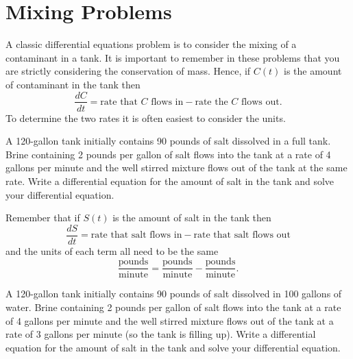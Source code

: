 \newpage\section{Mixing Problems}
A classic differential equations problem is to consider the mixing of a contaminant in a
tank.  It is important to remember in these problems that you are strictly considering the
conservation of mass.  Hence, if $C(t)$ is the amount of contaminant in the tank then
\[ \frac{dC}{dt} = \text{rate that $C$ flows in} - \text{rate the $C$ flows out}. \]
To determine the two rates it is often easiest to consider the units.
\begin{problem}
    A 120-gallon tank initially contains 90 pounds of salt dissolved in a full tank.
    Brine containing 2 pounds per gallon of salt flows into the tank at a rate of 4
    gallons per minute and the well stirred mixture flows out of the tank at the same
    rate.  Write a differential equation for the amount of salt in the tank and solve your
    differential equation.

    Remember that if $S(t)$ is the amount of salt in the tank then
    \[ \frac{dS}{dt} = \text{rate that salt flows in} - \text{rate that salt flows out} \]
    and the units of each term all need to be the same
    \[ \frac{\text{pounds}}{\text{minute}} = \frac{\text{pounds}}{\text{minute}} -
        \frac{\text{pounds}}{\text{minute}}. \]
\end{problem}
\solution{
    \[ \frac{dS}{dt} = 4(2) - \frac{4S}{120} \quad \text{with} \quad S(0) = 90. \]
    \[ \frac{dS}{dt} = -\frac{4}{120} \left( S - 8\left( \frac{120}{4} \right) \right) \]
    \[ S(t) = -150 e^{-4t/120} + 240 \]
}

\begin{problem}
    A 120-gallon tank initially contains 90 pounds of salt dissolved in 100 gallons of
    water.  Brine containing 2 pounds per gallon of salt flows into the tank at a rate of
    4 gallons per minute and the well stirred mixture flows out of the tank at a rate of 3
    gallons per minute (so the tank is filling up).  Write a differential equation for the
    amount of salt in the tank and solve your differential equation.
\end{problem}

